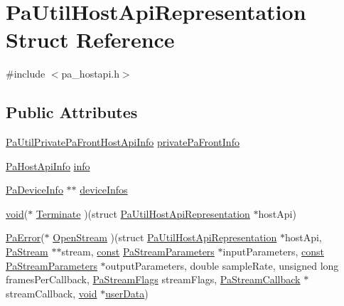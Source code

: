 \hypertarget{struct_pa_util_host_api_representation}{}\section{Pa\+Util\+Host\+Api\+Representation Struct Reference}
\label{struct_pa_util_host_api_representation}


{\ttfamily \#include $<$pa\+\_\+hostapi.\+h$>$}

\subsection*{Public Attributes}
\begin{DoxyCompactItemize}
\item 
\hyperlink{struct_pa_util_private_pa_front_host_api_info}{Pa\+Util\+Private\+Pa\+Front\+Host\+Api\+Info} \hyperlink{struct_pa_util_host_api_representation_a5bef19eb1f47b8b5153d5f2fb76699eb}{private\+Pa\+Front\+Info}
\item 
\hyperlink{struct_pa_host_api_info}{Pa\+Host\+Api\+Info} \hyperlink{struct_pa_util_host_api_representation_a9c443aa6cf07d3c46167a91b274a9e94}{info}
\item 
\hyperlink{struct_pa_device_info}{Pa\+Device\+Info} $\ast$$\ast$ \hyperlink{struct_pa_util_host_api_representation_a48dcfdf57e6d12d33314929ac213ae28}{device\+Infos}
\item 
\hyperlink{sound_8c_ae35f5844602719cf66324f4de2a658b3}{void}($\ast$ \hyperlink{struct_pa_util_host_api_representation_a832b3f01b9d9a84b5442e27d365f8b9f}{Terminate} )(struct \hyperlink{struct_pa_util_host_api_representation}{Pa\+Util\+Host\+Api\+Representation} $\ast$host\+Api)
\item 
\hyperlink{portaudio_8h_a4949e4a8ef9f9dbe8cbee414ce69841d}{Pa\+Error}($\ast$ \hyperlink{struct_pa_util_host_api_representation_aa415b57fadf39a49d6bc5740f06089e4}{Open\+Stream} )(struct \hyperlink{struct_pa_util_host_api_representation}{Pa\+Util\+Host\+Api\+Representation} $\ast$host\+Api, \hyperlink{portaudio_8h_a19874734f89958fccf86785490d53b4c}{Pa\+Stream} $\ast$$\ast$stream, \hyperlink{getopt1_8c_a2c212835823e3c54a8ab6d95c652660e}{const} \hyperlink{struct_pa_stream_parameters}{Pa\+Stream\+Parameters} $\ast$input\+Parameters, \hyperlink{getopt1_8c_a2c212835823e3c54a8ab6d95c652660e}{const} \hyperlink{struct_pa_stream_parameters}{Pa\+Stream\+Parameters} $\ast$output\+Parameters, double sample\+Rate, unsigned long frames\+Per\+Callback, \hyperlink{portaudio_8h_a37c7ac3ace7d2dd1430f40ecdee4ebb6}{Pa\+Stream\+Flags} stream\+Flags, \hyperlink{portaudio_8h_a8a60fb2a5ec9cbade3f54a9c978e2710}{Pa\+Stream\+Callback} $\ast$stream\+Callback, \hyperlink{sound_8c_ae35f5844602719cf66324f4de2a658b3}{void} $\ast$\hyperlink{xmlparse_8c_a4b666535c828e23ccd16510a0a1a1943}{user\+Data})

\end{DoxyCompactItemize}
